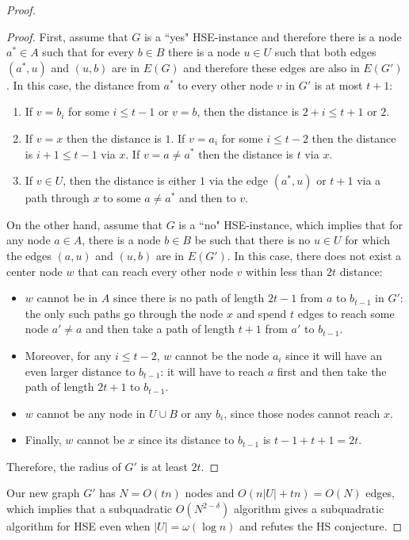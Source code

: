\begin{proof}
\begin{proof}
First, assume that $G$ is a ``yes" HSE-instance and therefore there is a node $a^*\in A$ such that for every $b \in B$ there is a node $u \in U$ such that both edges $(a^*,u)$ and $(u,b)$ are in $E(G)$ and therefore these edges are also in $E(G')$.
In this case, the distance from $a^*$ to every other node $v$ in $G'$ is at most $t+1$:
\begin{enumerate} 
\item If $v = b_i$ for some $i \leq t-1$ or $v=b$, then the distance is $2+i \leq t+1$ or $2$.
\item If $v = x$ then the distance is $1$. If $v= a_i$ for some $i \leq t-2$ then the distance is $i+1 \leq t-1$ via $x$. If $v = a \neq a^*$ then the distance is $t$ via $x$.
\item If $v \in U$, then the distance is either $1$ via the edge $(a^*,u)$ or $t+1$ via a path through $x$ to some $a \neq a^*$ and then to $v$.
\end{enumerate}
On the other hand, assume that $G$ is a ``no" HSE-instance, which implies that for any node $a\in A$, there is a node $b \in B$ be such that there is no $u \in U$ for which the edges $(a,u)$ and $(u,b)$ are in $E(G')$. 
In this case, there does not exist a center node $w$ that can reach every other node $v$ within less than $2t$ distance:
\begin{itemize}
\item $w$ cannot be in $A$ since there is no path of length $2t-1$ from $a$ to $b_{t-1}$ in $G'$: the only such paths go through the node $x$ and spend $t$ edges to reach some node $a' \neq a$ and then take a path of length $t+1$ from $a'$ to $b_{t-1}$.
\item Moreover, for any $i \leq t-2$, $w$ cannot be the node $a_i$ since it will have an even larger distance to $b_{t-1}$: it will have to reach $a$ first and then take the path of length $2t+1$ to $b_{t-1}$.
\item $w$ cannot be any node in $U \cup B$ or any $b_i$, since those nodes cannot reach $x$.
\item Finally, $w$ cannot be $x$ since its distance to $b_{t-1}$ is $t-1+t+1=2t$.
\end{itemize}

Therefore, the radius of $G'$ is at least $2t$.
\end{proof}

Our new graph $G'$ has $N=O(tn)$ nodes and $O(n|U| + tn)=O(N)$ edges, which implies that a subquadratic $O(N^{2-\delta})$ algorithm gives a subquadratic algorithm for HSE even when $|U|=\omega(\log{n})$ and refutes the HS conjecture.
\end{proof}

